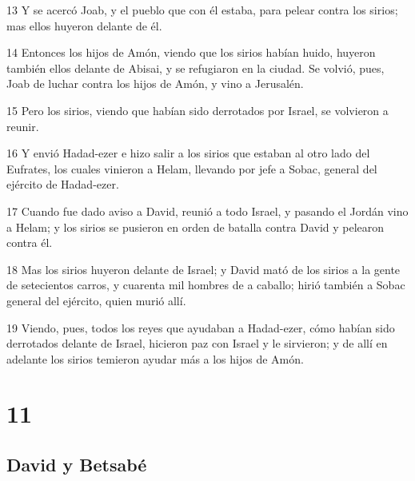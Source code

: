 \par 13 Y se acercó Joab, y el pueblo que con él estaba, para pelear contra los sirios; mas ellos huyeron delante de él.
\par 14 Entonces los hijos de Amón, viendo que los sirios habían huido, huyeron también ellos delante de Abisai, y se refugiaron en la ciudad. Se volvió, pues, Joab de luchar contra los hijos de Amón, y vino a Jerusalén.
\par 15 Pero los sirios, viendo que habían sido derrotados por Israel, se volvieron a reunir.
\par 16 Y envió Hadad-ezer e hizo salir a los sirios que estaban al otro lado del Eufrates, los cuales vinieron a Helam, llevando por jefe a Sobac, general del ejército de Hadad-ezer.
\par 17 Cuando fue dado aviso a David, reunió a todo Israel, y pasando el Jordán vino a Helam; y los sirios se pusieron en orden de batalla contra David y pelearon contra él.
\par 18 Mas los sirios huyeron delante de Israel; y David mató de los sirios a la gente de setecientos carros, y cuarenta mil hombres de a caballo; hirió también a Sobac general del ejército, quien murió allí.
\par 19 Viendo, pues, todos los reyes que ayudaban a Hadad-ezer, cómo habían sido derrotados delante de Israel, hicieron paz con Israel y le sirvieron; y de allí en adelante los sirios temieron ayudar más a los hijos de Amón.

\chapter{11}

\section*{David y Betsabé}

